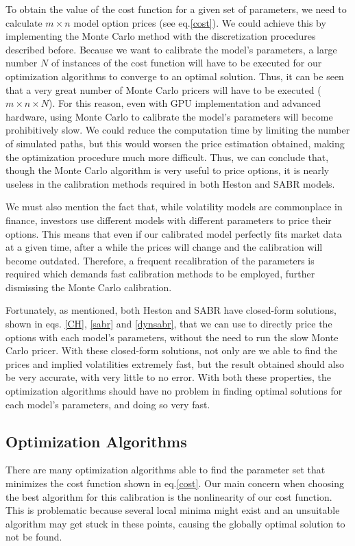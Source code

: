 To obtain the value of the cost function for a given set of parameters, we need to calculate $m\times n$ model option prices (see eq.\eqref{cost}). We could achieve this by implementing the Monte Carlo method with the discretization procedures described before.
Because we want to calibrate the model's parameters, a large number $N$ of instances of the cost function will have to be executed for our optimization algorithms to converge to an optimal solution.
Thus, it can be seen that a very great number of Monte Carlo pricers will have to be executed ($m\times n\times N$). For this reason, even with GPU implementation and advanced hardware, using Monte Carlo to calibrate the model's parameters will become prohibitively slow. We could reduce the computation time by limiting the number of simulated paths, but this would worsen the price estimation obtained, making the optimization procedure much more difficult.
Thus, we can conclude that, though the Monte Carlo algorithm is very useful to price options, it is nearly useless in the calibration methods required in both Heston and SABR models.


We must also mention the fact that, while volatility models are commonplace in finance, investors use different models with different parameters to price their options. This means that even if our calibrated model perfectly fits market data at a given time, after a while the prices will change and the calibration will become outdated. Therefore, a frequent recalibration of the parameters is required which demands fast calibration methods to be employed, further dismissing the Monte Carlo calibration.


Fortunately, as mentioned, both Heston and SABR have closed-form solutions, shown in eqs. \eqref{CH}, \eqref{sabr} and \eqref{dynsabr}, that we can use to directly price the options with each model's parameters, without the need to run the slow Monte Carlo pricer. With these closed-form solutions, not only are we able to find the prices and implied volatilities extremely fast, but the result obtained should also be very accurate, with very little to no error. With both these properties, the optimization algorithms should have no problem in finding optimal solutions for each model's parameters, and doing so very fast.





\subsection{Optimization Algorithms}
There are many optimization algorithms able to find the parameter set that minimizes the cost function shown in eq.\eqref{cost}.
Our main concern when choosing the best algorithm for this calibration is the nonlinearity of our cost function. This is problematic because several local minima might exist and an unsuitable algorithm may get stuck in these points, causing the globally optimal solution to not be found.

